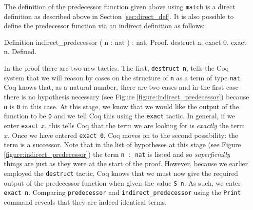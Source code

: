 The definition of the predecessor function given above using
\verb|match| is a direct definition as described above in
Section \ref{sec:direct_def}.  It is also possible to define the
predecessor function via an indirect definition as follows:
\begin{center}
  \begin{coqcode}
Definition indirect_predecessor ( n : nat ) : nat.
Proof.
  destruct n. exact 0. exact n.
Defined.
  \end{coqcode}
\end{center}
In the proof there are two new tactics.  The first,
\verb|destruct n|, tells the Coq system that we will reason by
cases on the structure of \verb|n| as a term of type
\verb|nat|.  Coq knows that, as a natural number, there are two
cases and in the first case there is no hypothesis necessary (see
Figure \ref{figure:indirect_predecessor}) because \verb|n| is
\verb|0| in this case.  At this stage, we know that we would like
the output of the function to be \verb|0| and we tell Coq this
using the \verb|exact| tactic.  In general, if we enter
\verb|exact| $x$, this tells Coq that the term we are looking for
is \emph{exactly} the term $x$.  Once we have entered
 \verb|exact 0|, Coq moves on to the second possibility: the term is a successor.
Note that in the list of hypotheses at this stage (see Figure
\ref{figure:indirect_predecessor}) the term \verb|n : nat| is
listed and so \emph{superficially} things are just as they were at the
start of the proof.  However, because we earlier employed the
\verb|destruct| tactic, Coq knows that we must now give the
required output of the predecessor function when given the value
\verb|S n|.  As such, we enter \verb|exact n|.  Comparing
\verb|predecessor| and \verb|indirect_predecessor| using the
\verb|Print| command reveals that they are indeed identical terms.
